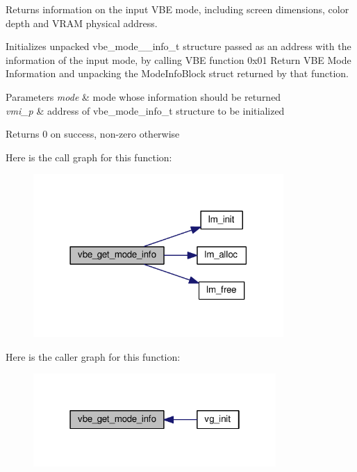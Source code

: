 Returns information on the input V\+BE mode, including screen dimensions, color depth and V\+R\+AM physical address. 

Initializes unpacked vbe\+\_\+mode\+\_\+\+\_\+info\+\_\+t structure passed as an address with the information of the input mode, by calling V\+BE function 0x01 Return V\+BE Mode Information and unpacking the Mode\+Info\+Block struct returned by that function.


\begin{DoxyParams}{Parameters}
{\em mode} & mode whose information should be returned \\
\hline
{\em vmi\+\_\+p} & address of vbe\+\_\+mode\+\_\+info\+\_\+t structure to be initialized \\
\hline
\end{DoxyParams}
\begin{DoxyReturn}{Returns}
0 on success, non-\/zero otherwise 
\end{DoxyReturn}


Here is the call graph for this function\+:
\nopagebreak
\begin{figure}[H]
\begin{center}
\leavevmode
\includegraphics[width=270pt]{group__vbe_ga4ef3234e41f2050bc094a22049b69e45_cgraph}
\end{center}
\end{figure}




Here is the caller graph for this function\+:
\nopagebreak
\begin{figure}[H]
\begin{center}
\leavevmode
\includegraphics[width=262pt]{group__vbe_ga4ef3234e41f2050bc094a22049b69e45_icgraph}
\end{center}
\end{figure}


